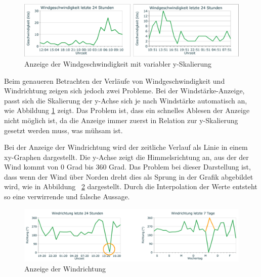 \begin{figure}[h!]
	\centering
	\includegraphics[width=1\linewidth]{img/wind-geschw}
	\caption{Anzeige der Windgeschwindigkeit mit variabler y-Skalierung}
	\label{img:wind-geschw}
\end{figure}

\noindent
Beim genaueren Betrachten der Verläufe von Windgeschwindigkeit und Windrichtung zeigen sich jedoch zwei Probleme.
Bei der Windstärke-Anzeige, passt sich die Skalierung der y-Achse sich je nach Windstärke automatisch an, wie Abbildung \ref{img:wind-geschw} zeigt. Das Problem ist, dass ein schnelles Ablesen der Anzeige nicht möglich ist, da die Anzeige immer zuerst in Relation zur y-Skalierung gesetzt werden muss, was mühsam ist.
\newline



\noindent
Bei der Anzeige der Windrichtung wird der zeitliche Verlauf als Linie in einem xy-Graphen dargestellt. Die y-Achse zeigt die Himmelsrichtung an, aus der der Wind kommt von 0 Grad bis 360 Grad. Das Problem bei dieser Darstellung ist, dass wenn der Wind über Norden dreht dies als Sprung in der Grafik abgebildet wird, wie in Abbildung~ \ref{img:wind-richtung} dargestellt. Durch die Interpolation der Werte entsteht so eine verwirrende und falsche Aussage.
\newline

\begin{figure}[h!]
	\centering
	\includegraphics[width=1\linewidth]{img/wind-richtung}
	\caption{Anzeige der Windrichtung}
	\label{img:wind-richtung}
\end{figure}

